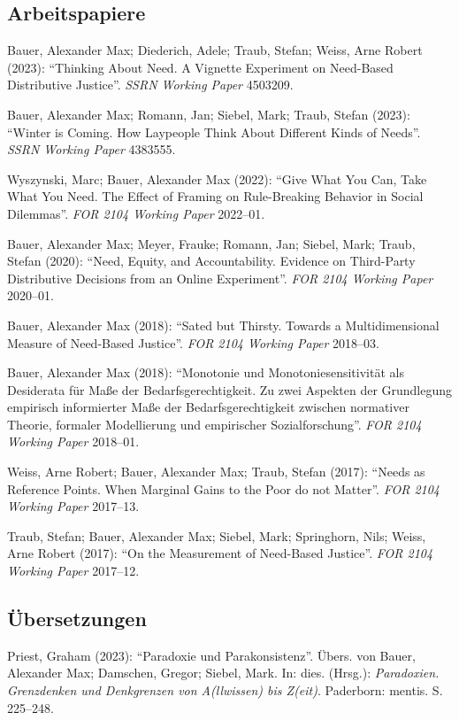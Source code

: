 \documentclass[a4paper,10pt]{article}
\newenvironment{literature}{%
   \parskip6pt\parindent0pt\raggedright
   \def\lititem{\hangindent=1cm\hangafter1}}{%
   \par\ignorespaces}
\begin{document}
\subsection*{Arbeitspapiere}
\begin{literature}
\lititem Bauer, Alexander Max; Diederich, Adele; Traub, Stefan; Weiss, Arne Robert (2023): \enquote{Thinking About Need. A Vignette Experiment on Need-Based Distributive Justice}. \textit{SSRN Working Paper} 4503209.

\lititem Bauer, Alexander Max; Romann, Jan; Siebel, Mark; Traub, Stefan (2023): \enquote{Winter is Coming. How Laypeople Think About Different Kinds of Needs}. \textit{SSRN Working Paper} 4383555.

\lititem Wyszynski, Marc; Bauer, Alexander Max (2022): \enquote{Give What You Can, Take What You Need. The Effect of Framing on Rule-Breaking Behavior in Social Dilemmas}. \textit{FOR 2104 Working Paper} 2022--01.

\lititem Bauer, Alexander Max; Meyer, Frauke; Romann, Jan; Siebel, Mark; Traub, Stefan (2020): \enquote{Need, Equity, and Accountability. Evidence on Third-Party Distributive Decisions from an Online Experiment}. \textit{FOR 2104 Working Paper} 2020--01.

\lititem Bauer, Alexander Max (2018): \enquote{Sated but Thirsty. Towards a Multidimensional Measure of Need-Based Justice}. \textit{FOR 2104 Working Paper} 2018--03.

\lititem Bauer, Alexander Max (2018): \enquote{Monotonie und Monotoniesensitivität als Desiderata für Maße der Bedarfsgerechtigkeit. Zu zwei Aspekten der Grundlegung empirisch informierter Maße der Bedarfsgerechtigkeit zwischen normativer Theorie, formaler Modellierung und empirischer Sozialforschung}. \textit{FOR 2104 Working Paper} 2018--01.

\lititem Weiss, Arne Robert; Bauer, Alexander Max; Traub, Stefan (2017): \enquote{Needs as Reference Points. When Marginal Gains to the Poor do not Matter}. \textit{FOR 2104 Working Paper} 2017--13.

\lititem Traub, Stefan; Bauer, Alexander Max; Siebel, Mark; Springhorn, Nils; Weiss, Arne Robert (2017): \enquote{On the Measurement of Need-Based Justice}. \textit{FOR 2104 Working Paper} 2017--12.
\end{literature}

\subsection*{Übersetzungen}
\begin{literature}
\lititem Priest, Graham (2023): \enquote{Paradoxie und Parakonsistenz}. Übers. von Bauer, Alexander Max; Damschen, Gregor; Siebel, Mark. In: dies. (Hrsg.): \textit{Paradoxien. Grenzdenken und Denkgrenzen von A(llwissen) bis Z(eit)}. Paderborn: mentis. S. 225--248.
\end{literature}
\end{document}
